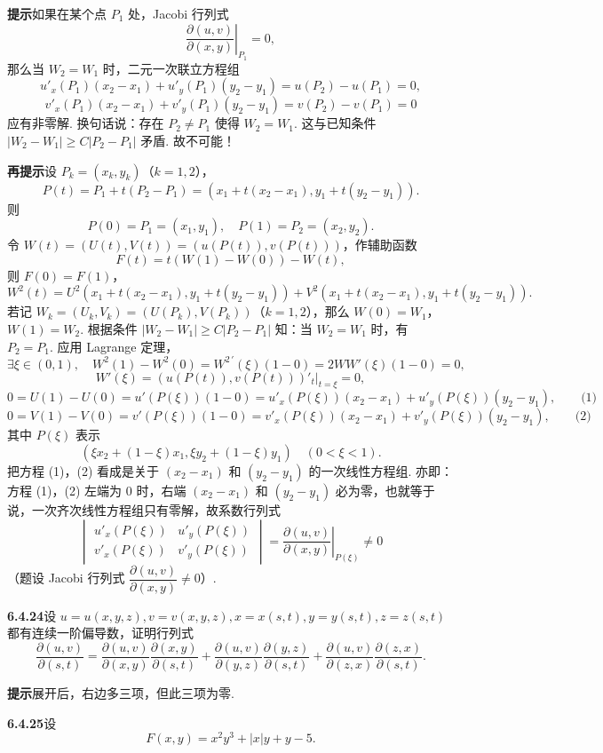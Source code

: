 \documentclass[UTF8, 12pt, fontset=fandol, oneside]{ctexart}
\begin{document}
\noindent\textbf{提示}\quad 如果在某个点 $P_1$ 处，Jacobi 行列式
\[
  \left.\frac{\partial(u,v)}{\partial(x,y)}\right|_{P_1}=0,
\]
那么当 $W_2=W_1$ 时，二元一次联立方程组
\[
  u'_x(P_1)(x_2-x_1)+u'_y(P_1)(y_2-y_1)=u(P_2)-u(P_1)=0,
\]
\[
  v'_x(P_1)(x_2-x_1)+v'_y(P_1)(y_2-y_1)=v(P_2)-v(P_1)=0
\]
应有非零解. 换句话说：存在 $P_2\ne P_1$ 使得 $W_2=W_1$. 这与已知条件
$|W_2-W_1|\ge C|P_2-P_1|$ 矛盾. 故不可能！

\noindent\textbf{再提示}\quad 设 $P_k=(x_k,y_k)$（$k=1,2$），
\[
  P(t)=P_1+t(P_2-P_1)=(x_1+t(x_2-x_1),y_1+t(y_2-y_1)).
\]
则
\[
  P(0)=P_1=(x_1,y_1),\quad P(1)=P_2=(x_2,y_2).
\]
令 $W(t)=(U(t),V(t))=(u(P(t)),v(P(t)))$，作辅助函数
\[
  F(t)=t(W(1)-W(0))-W(t),
\]
则 $F(0)=F(1)$，
\[
  W^2(t)=U^2(x_1+t(x_2-x_1),y_1+t(y_2-y_1))
  +V^2(x_1+t(x_2-x_1),y_1+t(y_2-y_1)).
\]
若记 $W_k=(U_k,V_k)=(U(P_k),V(P_k))$（$k=1,2$），那么 $W(0)=W_1$，
$W(1)=W_2$. 根据条件 $|W_2-W_1|\ge C|P_2-P_1|$ 知：当 $W_2=W_1$ 时，有 $P_2=P_1$. 应用 Lagrange 定理，
\[
  \exists\xi\in(0,1),\quad
  W^2(1)-W^2(0)=W^{2\,\prime}(\xi)(1-0)=2WW'(\xi)(1-0)=0,
\]
\[
  W'(\xi)=(u(P(t)),v(P(t)))'_t|_{t=\xi}=0,
\]
\[
  0=U(1)-U(0)=u'(P(\xi))(1-0)
  =u'_x(P(\xi))(x_2-x_1)+u'_y(P(\xi))(y_2-y_1), \qquad\text{(1)}
\]
\[
  0=V(1)-V(0)=v'(P(\xi))(1-0)
  =v'_x(P(\xi))(x_2-x_1)+v'_y(P(\xi))(y_2-y_1), \qquad\text{(2)}
\]
其中 $P(\xi)$ 表示
\[
  (\xi x_2+(1-\xi)x_1,\xi y_2+(1-\xi)y_1)\quad(0<\xi<1).
\]
把方程 (1)，(2) 看成是关于 $(x_2-x_1)$ 和 $(y_2-y_1)$ 的一次线性方程组. 亦即：方程 (1)，(2) 左端为 $0$ 时，右端 $(x_2-x_1)$ 和 $(y_2-y_1)$ 必为零，也就等于说，一次齐次线性方程组只有零解，故系数行列式
\[
  \begin{vmatrix}
    u'_x(P(\xi)) & u'_y(P(\xi))\\
    v'_x(P(\xi)) & v'_y(P(\xi))
  \end{vmatrix}
  =
  \left.\frac{\partial(u,v)}{\partial(x,y)}\right|_{P(\xi)}
  \ne0
\]
（题设 Jacobi 行列式 $\dfrac{\partial(u,v)}{\partial(x,y)}\ne0$）.

\noindent\textbf{6.4.24}\quad 设 $u=u(x,y,z),v=v(x,y,z),x=x(s,t),y=y(s,t),z=z(s,t)$ 都有连续一阶偏导数，证明行列式
\[
  \frac{\partial(u,v)}{\partial(s,t)}
  =
  \frac{\partial(u,v)}{\partial(x,y)}
  \frac{\partial(x,y)}{\partial(s,t)}
  +
  \frac{\partial(u,v)}{\partial(y,z)}
  \frac{\partial(y,z)}{\partial(s,t)}
  +
  \frac{\partial(u,v)}{\partial(z,x)}
  \frac{\partial(z,x)}{\partial(s,t)}.
\]

\noindent\textbf{提示}\quad 展开后，右边多三项，但此三项为零.

\noindent\textbf{6.4.25}\quad 设
\[
  F(x,y)=x^2y^3+|x|y+y-5.
\]
\end{document}
